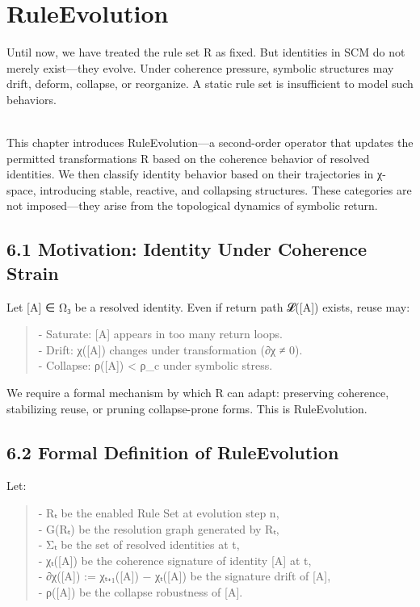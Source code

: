 \chapter{RuleEvolution}

Until now, we have treated the rule set R as fixed. But identities in
SCM do not merely exist---they evolve. Under coherence pressure,
symbolic structures may drift, deform, collapse, or reorganize. A static
rule set is insufficient to model such behaviors.\\
\strut \\
This chapter introduces RuleEvolution---a second-order operator that
updates the permitted transformations R based on the coherence behavior
of resolved identities. We then classify identity behavior based on
their trajectories in χ-space, introducing stable, reactive, and
collapsing structures. These categories are not imposed---they arise
from the topological dynamics of symbolic return.

\section{6.1 \textbar{} Motivation: Identity Under Coherence
Strain}\label{motivation-identity-under-coherence-strain}

Let {[}A{]} ∈ Ω₃ be a resolved identity. Even if return path 𝓛({[}A{]})
exists, reuse may:

\begin{quote}
- Saturate: {[}A{]} appears in too many return loops.\\
- Drift: χ({[}A{]}) changes under transformation (∂χ ≠ 0).\\
- Collapse: ρ({[}A{]}) \textless{} ρ\_c under symbolic stress.
\end{quote}

We require a formal mechanism by which R can adapt: preserving
coherence, stabilizing reuse, or pruning collapse-prone forms. This is
RuleEvolution.

\section{6.2 \textbar{} Formal Definition of
RuleEvolution}\label{formal-definition-of-ruleevolution}

Let:

\begin{quote}
- Rₜ be the enabled Rule Set at evolution step n,\\
- G(Rₜ) be the resolution graph generated by Rₜ,\\
- Σₜ be the set of resolved identities at t,\\
- χₜ({[}A{]}) be the coherence signature of identity {[}A{]} at t,\\
- ∂χ({[}A{]}) := χₜ₊₁({[}A{]}) − χₜ({[}A{]}) be the signature drift of
{[}A{]},\\
- ρ({[}A{]}) be the collapse robustness of {[}A{]}.
\end{quote}

